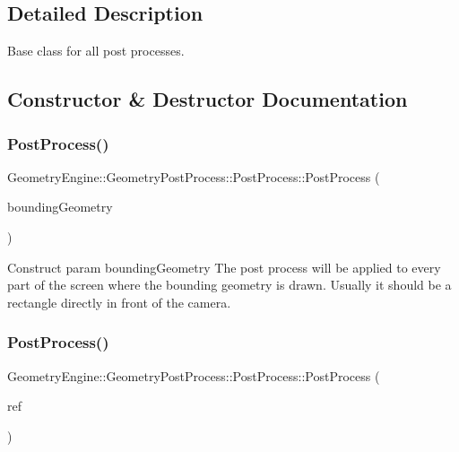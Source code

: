 \subsection{Detailed Description}
Base class for all post processes. 

\subsection{Constructor \& Destructor Documentation}
\mbox{\label{class_geometry_engine_1_1_geometry_post_process_1_1_post_process_a3df1b89c25bd790e3ded93e088aca222}} 
\subsubsection{\texorpdfstring{PostProcess()}{PostProcess()}\hspace{0.1cm}{\footnotesize\ttfamily [1/2]}}
{\footnotesize\ttfamily Geometry\+Engine\+::\+Geometry\+Post\+Process\+::\+Post\+Process\+::\+Post\+Process (\begin{DoxyParamCaption}\item[{const \mbox{\hyperlink{class_geometry_engine_1_1_geometry_world_item_1_1_geometry_item_1_1_geometry_item}{Geometry\+World\+Item\+::\+Geometry\+Item\+::\+Geometry\+Item}} \&}]{bounding\+Geometry }\end{DoxyParamCaption})}

Construct param bounding\+Geometry The post process will be applied to every part of the screen where the bounding geometry is drawn. Usually it should be a rectangle directly in front of the camera. \mbox{\label{class_geometry_engine_1_1_geometry_post_process_1_1_post_process_af5599c4257746130644eb6beb421a25a}} 
\subsubsection{\texorpdfstring{PostProcess()}{PostProcess()}\hspace{0.1cm}{\footnotesize\ttfamily [2/2]}}
{\footnotesize\ttfamily Geometry\+Engine\+::\+Geometry\+Post\+Process\+::\+Post\+Process\+::\+Post\+Process (\begin{DoxyParamCaption}\item[{const \mbox{\hyperlink{class_geometry_engine_1_1_geometry_post_process_1_1_post_process}{Post\+Process}} \&}]{ref }\end{DoxyParamCaption})}

